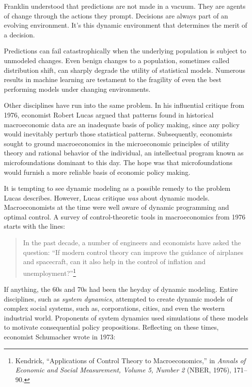 \documentclass{tufte-book}
\begin{document}
Franklin understood that predictions are not made in a vacuum. They are
agents of change through the actions they prompt. Decisions are always
part of an evolving environment. It's this dynamic environment that
determines the merit of a decision.

Predictions can fail catastrophically when the underlying population is
subject to unmodeled changes. Even benign changes to a population,
sometimes called distribution shift, can sharply degrade the utility of
statistical models. Numerous results in machine learning are testament
to the fragility of even the best performing models under changing
environments.

Other disciplines have run into the same problem. In his influential
critique from 1976, economist Robert Lucas argued that patterns found in
historical macroeconomic data are an inadequate basis of policy making,
since any policy would inevitably perturb those statistical patterns.
Subsequently, economists sought to ground macroeconomics in the
microeconomic principles of utility theory and rational behavior of the
individual, an intellectual program known as microfoundations dominant
to this day. The hope was that microfoundations would furnish a more
reliable basis of economic policy making.

It is tempting to see dynamic modeling as a possible remedy to the
problem Lucas describes. However, Lucas critique \emph{was} about
dynamic models. Macroeconomists at the time were well aware of dynamic
programming and optimal control. A survey of control-theoretic tools in
macroeconomics from 1976 starts with the lines:

\begin{quote}
In the past decade, a number of engineers and economists have asked the
question: ``If modern control theory can improve the guidance of
airplanes and spacecraft, can it also help in the control of inflation
and unemployment?''\footnote{Kendrick, {``Applications of Control Theory
  to Macroeconomics,''} in \emph{Annals of Economic and Social
  Measurement, Volume 5, Number 2} (NBER, 1976), 171--90.}
\end{quote}

If anything, the 60s and 70s had been the heyday of dynamic modeling.
Entire disciplines, such as \emph{system dynamics}, attempted to create
dynamic models of complex social systems, such as, corporations, cities,
and even the western industrial world. Proponents of system dynamics
used simulations of these models to motivate consequential policy
propositions. Reflecting on these times, economist Schumacher wrote in
1973:
\end{document}

